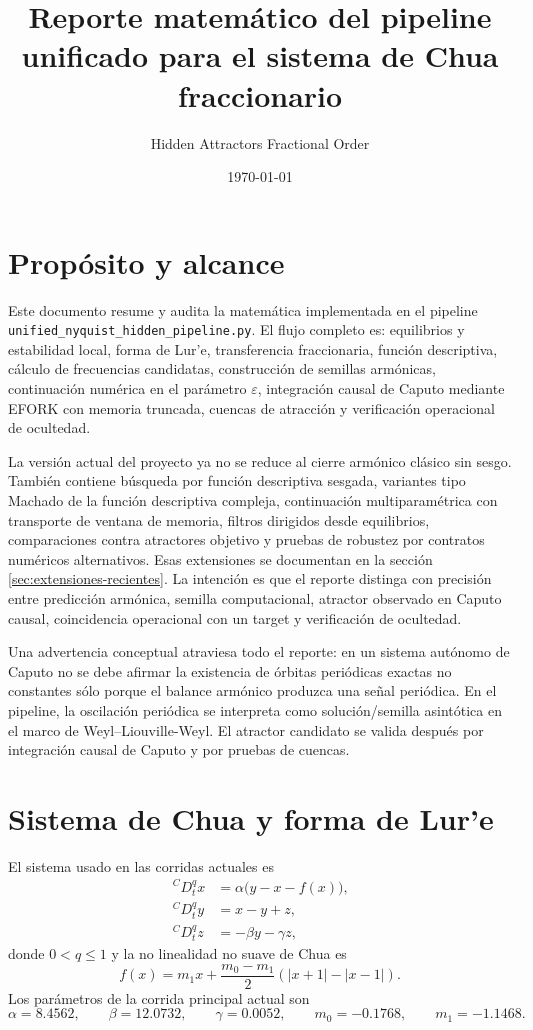 \documentclass[11pt]{article}
\title{Reporte matemático del pipeline unificado para el sistema de Chua fraccionario}
\author{Hidden Attractors Fractional Order}
\date{\today}
\newcommand{\CaputoD}{\,{}^{C}D_t^q}
\begin{document}
\maketitle

\section{Propósito y alcance}

Este documento resume y audita la matemática implementada en el pipeline
\texttt{unified\_nyquist\_hidden\_pipeline.py}. El flujo completo es:
equilibrios y estabilidad local, forma de Lur'e, transferencia fraccionaria,
función descriptiva, cálculo de frecuencias candidatas, construcción de
semillas armónicas, continuación numérica en el parámetro \(\varepsilon\),
integración causal de Caputo mediante EFORK con memoria truncada, cuencas de
atracción y verificación operacional de ocultedad.

La versión actual del proyecto ya no se reduce al cierre armónico clásico sin
sesgo. También contiene búsqueda por función descriptiva sesgada, variantes
tipo Machado de la función descriptiva compleja, continuación multiparamétrica
con transporte de ventana de memoria, filtros dirigidos desde equilibrios,
comparaciones contra atractores objetivo y pruebas de robustez por contratos
numéricos alternativos. Esas extensiones se documentan en la sección
\ref{sec:extensiones-recientes}. La intención es que el reporte distinga con
precisión entre predicción armónica, semilla computacional, atractor observado
en Caputo causal, coincidencia operacional con un target y verificación de
ocultedad.

Una advertencia conceptual atraviesa todo el reporte: en un sistema autónomo
de Caputo no se debe afirmar la existencia de órbitas periódicas exactas no
constantes sólo porque el balance armónico produzca una señal periódica. En el
pipeline, la oscilación periódica se interpreta como solución/semilla
asintótica en el marco de Weyl--Liouville-Weyl. El atractor candidato se valida
después por integración causal de Caputo y por pruebas de cuencas.

\section{Sistema de Chua y forma de Lur'e}

El sistema usado en las corridas actuales es
\begin{align}
\CaputoD x &= \alpha\bigl(y-x-f(x)\bigr),\\
\CaputoD y &= x-y+z,\\
\CaputoD z &= -\beta y-\gamma z,
\end{align}
donde \(0<q\leq 1\) y la no linealidad no suave de Chua es
\begin{equation}
f(x)=m_1x+\frac{m_0-m_1}{2}\left(|x+1|-|x-1|\right).
\end{equation}
Los parámetros de la corrida principal actual son
\[
\alpha=8.4562,\qquad
\beta=12.0732,\qquad
\gamma=0.0052,\qquad
m_0=-0.1768,\qquad
m_1=-1.1468.
\]
\end{document}
